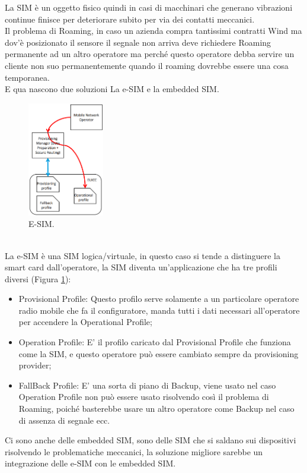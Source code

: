 \documentclass[11pt, twocolumn]{article}
\newenvironment{myitemize}
{ \begin{itemize}[topsep=0ex]
		\setlength{\itemsep}{0pt}
		\setlength{\parskip}{0pt}
		\setlength{\parsep}{0pt}     }
	{ \end{itemize}                  }
\begin{document}
La SIM è un oggetto fisico quindi in casi di macchinari che generano vibrazioni continue finisce per deteriorare subito per via dei contatti meccanici.\\
Il problema di Roaming, in caso un azienda compra  tantissimi contratti Wind ma dov'è posizionato il sensore il segnale non arriva deve richiedere Roaming permanente ad un altro operatore ma perché questo operatore debba servire un cliente non suo permanentemente quando il roaming dovrebbe essere una cosa temporanea.\\
E qua nascono due soluzioni La e-SIM e la embedded SIM. 
\begin{figure}[!h]
  \centering
  \includegraphics[width=\linewidth,height=5cm]{imgs/esim.png}
  \caption{E-SIM.}
  \label{fig:esim}
\end{figure}\\
La e-SIM è una SIM logica/virtuale, in questo caso si tende a distinguere la smart card dall'operatore, la SIM diventa un'applicazione che ha tre profili diversi (Figura \ref{fig:esim}):
\begin{myitemize}
  \item Provisional Profile: Questo profilo serve solamente a un particolare operatore radio mobile che fa il configuratore, manda tutti i dati necessari all'operatore per accendere la Operational Profile;
  \item Operation Profile: E' il profilo caricato dal Provisional Profile che funziona come la SIM, e questo operatore può essere cambiato sempre da provisioning provider;
  \item FallBack Profile: E' una sorta di piano di Backup, viene usato nel caso Operation Profile non può essere usato risolvendo così il problema di Roaming, poiché basterebbe usare un altro operatore come Backup nel caso di assenza di segnale ecc.
\end{myitemize}
Ci sono anche delle embedded SIM, sono delle SIM che si saldano sui dispositivi risolvendo le problematiche meccanici, la soluzione migliore sarebbe un integrazione delle e-SIM con le embedded SIM.
\end{document}
